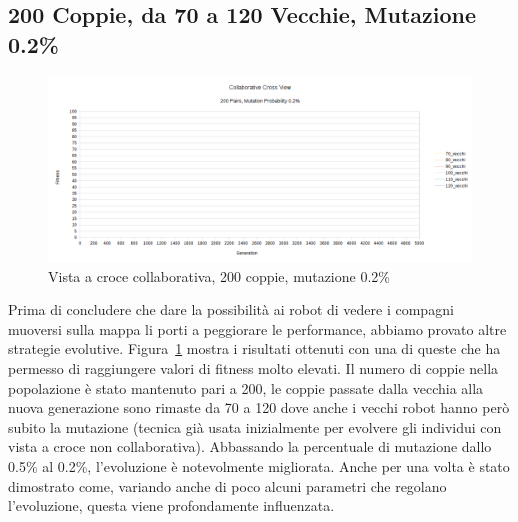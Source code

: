 \subsection{200 Coppie, da 70 a 120 Vecchie, Mutazione 0.2\%}
\begin{figure}[ht]
	\centering
	\includegraphics[scale=0.7,angle=90]{imgs/cross_c_200_pairs_70_120_old_02_mutation.png}
	\caption{Vista a croce collaborativa, 200 coppie, mutazione 0.2\%}
	\label{figure:cross_c_200_70_120_mutation_02}
\end{figure}
Prima di concludere che dare la possibilità ai robot di vedere i compagni
muoversi sulla mappa li porti a peggiorare le performance, abbiamo provato
altre strategie evolutive.\newline
Figura~\ref{figure:cross_c_200_70_120_mutation_02} mostra i risultati ottenuti
con una di queste che ha permesso di raggiungere valori di fitness molto
elevati. Il numero di coppie nella popolazione è stato mantenuto pari a 200, le
coppie passate dalla vecchia alla nuova generazione sono rimaste da 70 a 120
dove anche i vecchi robot hanno però subito la mutazione (tecnica già usata
inizialmente per evolvere gli individui con vista a croce non collaborativa).
Abbassando la percentuale di mutazione dallo 0.5\% al 0.2\%, l'evoluzione è
notevolmente migliorata.\newline
Anche per una volta è stato dimostrato come, variando anche di poco alcuni
parametri che regolano l'evoluzione, questa viene profondamente influenzata.



\clearpage



